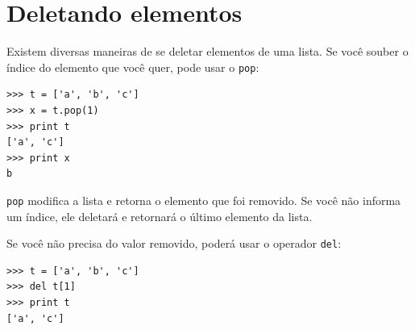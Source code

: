 
\section{Deletando elementos}


Existem diversas maneiras de se deletar elementos de uma lista. Se você
souber o índice do elemento que você quer, pode usar o {\tt pop}:


\beforeverb
\begin{verbatim}
>>> t = ['a', 'b', 'c']
>>> x = t.pop(1)
>>> print t
['a', 'c']
>>> print x
b
\end{verbatim}
\afterverb
%

{\tt pop} modifica a lista e retorna o elemento que foi removido.
Se você não informa um índice, ele deletará e retornará o último elemento da lista.

Se você não precisa do valor removido, poderá usar o operador {\tt del}:


\beforeverb
\begin{verbatim}
>>> t = ['a', 'b', 'c']
>>> del t[1]
>>> print t
['a', 'c']
\end{verbatim}
\afterverb
%

